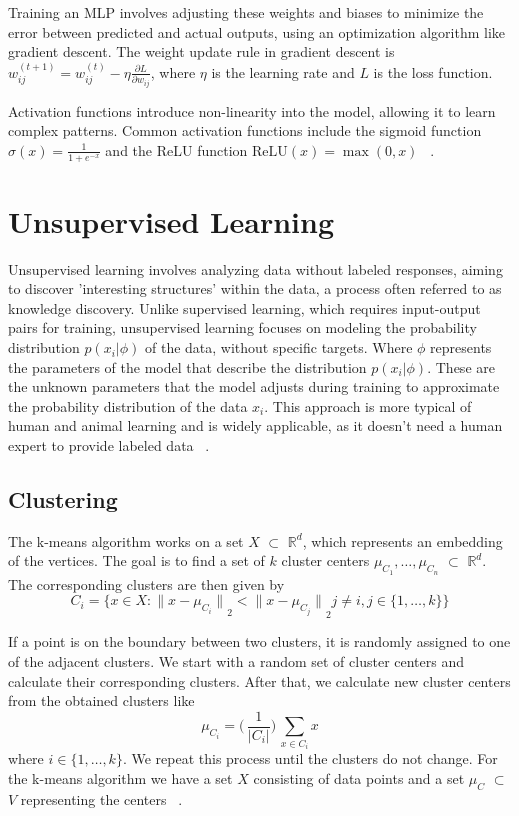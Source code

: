 Training an MLP involves adjusting these weights and biases to minimize the error between predicted and actual outputs, using an optimization algorithm like gradient descent. The weight update rule in gradient descent is \( w_{ij}^{(t+1)} = w_{ij}^{(t)} - \eta \frac{\partial L}{\partial w_{ij}} \), where \( \eta \) is the learning rate and \( L \) is the loss function.

Activation functions introduce non-linearity into the model, allowing it to learn complex patterns. Common activation functions include the sigmoid function \( \sigma(x) = \frac{1}{1 + e^{-x}} \) and the ReLU function \( \text{ReLU}(x) = \max(0, x) \) ~\cite{NNs}.

\section{Unsupervised Learning}

Unsupervised learning involves analyzing data without labeled responses, aiming to discover 'interesting structures' within the data, a process often referred to as knowledge discovery. Unlike supervised learning, which requires input-output pairs for training, unsupervised learning focuses on modeling the probability distribution $p(x_i|\phi)$ of the data, without specific targets. Where \(\phi\) represents the parameters of the model that describe the distribution \( p(x_i|\phi) \). These are the unknown parameters that the model adjusts during training to approximate the probability distribution of the data \( x_i \).
This approach is more typical of human and animal learning and is widely applicable, as it doesn't need a human expert to provide labeled data ~\cite{murphy2013machine}.

\subsection{Clustering}

The k-means algorithm works on a set $X$ $\subset$ $\mathbb{R}^d$, which represents an embedding of the vertices. The goal is to find a set of $k$ cluster centers $\mu_C_1$$, \dots ,$$ \mu_C_n$ $\subset$ $\mathbb{R}^d$. The corresponding clusters are then given by 
\begin{equation}
    C_i = {\{x \in X : \lVert x - \mu_{C_i} \rVert}_2 < {\lVert x - \mu_{C_j} \rVert}_2 j \neq i , j\in \{1,\dots ,k\}\}
\end{equation}

If a point is on the boundary between two clusters, it is randomly assigned to one of the adjacent clusters.
We start with a random set of cluster centers and calculate their corresponding clusters.
After that, we calculate new cluster centers from the obtained clusters like 
\begin{equation}
    \mu_{C_i} = \Big(\,\frac{1}{|C_i|}\Big)\,\sum_{x \in C_i}x
\end{equation} 
where $i \in \{1, \dots, k\}$.
We repeat this process until the clusters do not change.
For the k-means algorithm we have a set $X$ consisting of data points and a set $\mu_C$ $\subset$ $V$ representing the centers ~\cite{murphy2013machine}. 

